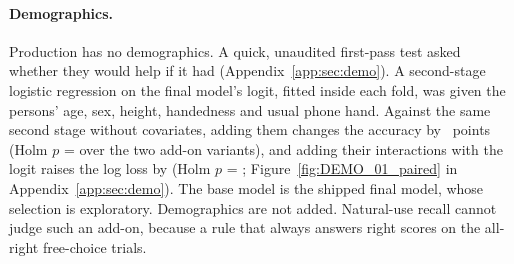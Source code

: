 \paragraph{Demographics.} Production has no demographics. A quick, unaudited first-pass test asked whether they
would help if it had (Appendix~\ref{app:sec:demo}). A second-stage logistic regression on the final model's logit,
fitted inside each fold, was given the persons' age, sex, height, handedness and usual phone hand. Against the same
second stage without covariates, adding them changes the accuracy by ~points (Holm $p$ =  over the two add-on
variants), and adding their
interactions with the logit raises the log loss by  (Holm $p$ = ;
Figure~\ref{fig:DEMO_01_paired} in Appendix~\ref{app:sec:demo}). The base model is the shipped final model, whose selection is exploratory.
Demographics are not added. Natural-use recall cannot judge such an add-on, because a rule that always answers right
scores  on the all-right free-choice trials.
